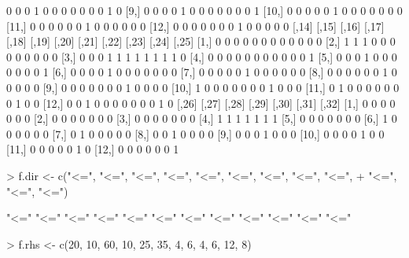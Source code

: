 \documentclass[a4paper,11pt]{scrartcl}
\begin{document}
\begin{Schunk}
\begin{Soutput}
 [8,]    0    0    0    1    0    0    0    0    0     0     0     1     0
 [9,]    0    0    0    0    1    0    0    0    0     0     0     0     1
[10,]    0    0    0    0    0    1    0    0    0     0     0     0     0
[11,]    0    0    0    0    0    0    1    0    0     0     0     0     0
[12,]    0    0    0    0    0    0    0    1    0     0     0     0     0
      [,14] [,15] [,16] [,17] [,18] [,19] [,20] [,21] [,22] [,23] [,24] [,25]
 [1,]     0     0     0     0     0     0     0     0     0     0     0     0
 [2,]     1     1     1     0     0     0     0     0     0     0     0     0
 [3,]     0     0     0     1     1     1     1     1     1     1     1     0
 [4,]     0     0     0     0     0     0     0     0     0     0     0     1
 [5,]     0     0     0     1     0     0     0     0     0     0     0     1
 [6,]     0     0     0     0     1     0     0     0     0     0     0     0
 [7,]     0     0     0     0     0     1     0     0     0     0     0     0
 [8,]     0     0     0     0     0     0     1     0     0     0     0     0
 [9,]     0     0     0     0     0     0     0     1     0     0     0     0
[10,]     1     0     0     0     0     0     0     0     1     0     0     0
[11,]     0     1     0     0     0     0     0     0     0     1     0     0
[12,]     0     0     1     0     0     0     0     0     0     0     1     0
      [,26] [,27] [,28] [,29] [,30] [,31] [,32]
 [1,]     0     0     0     0     0     0     0
 [2,]     0     0     0     0     0     0     0
 [3,]     0     0     0     0     0     0     0
 [4,]     1     1     1     1     1     1     1
 [5,]     0     0     0     0     0     0     0
 [6,]     1     0     0     0     0     0     0
 [7,]     0     1     0     0     0     0     0
 [8,]     0     0     1     0     0     0     0
 [9,]     0     0     0     1     0     0     0
[10,]     0     0     0     0     1     0     0
[11,]     0     0     0     0     0     1     0
[12,]     0     0     0     0     0     0     1
\end{Soutput}
\begin{Sinput}
> f.dir <- c("<=", "<=", "<=", "<=", "<=", "<=", "<=", "<=", "<=", 
+     "<=", "<=", "<=")
\end{Sinput}
\begin{Soutput}
 [1] "<=" "<=" "<=" "<=" "<=" "<=" "<=" "<=" "<=" "<=" "<=" "<="
\end{Soutput}
\begin{Sinput}
> f.rhs <- c(20, 10, 60, 10, 25, 35, 4, 6, 4, 6, 12, 8)
\end{Sinput}

\end{Schunk}
\end{document}
